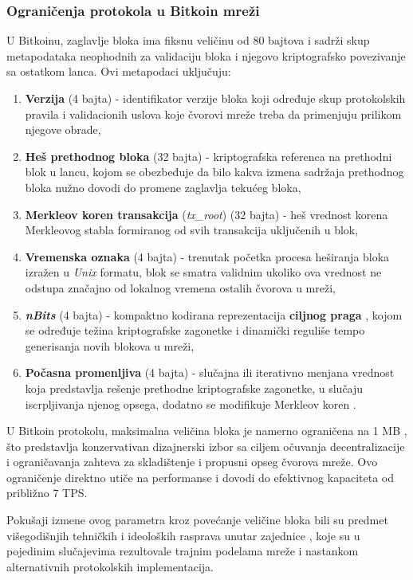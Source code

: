 \subsubsection{Ograničenja protokola u Bitkoin mreži}
U Bitkoinu, zaglavlje bloka ima fiksnu veličinu od 80 bajtova i sadrži skup metapodataka neophodnih za validaciju bloka i njegovo kriptografsko povezivanje sa ostatkom lanca. Ovi metapodaci uključuju:
\begin{enumerate}
\item \textbf{Verzija} (4 bajta) - identifikator verzije bloka koji određuje skup protokolskih pravila i validacionih uslova koje čvorovi mreže treba da primenjuju prilikom njegove obrade,
\item \textbf{Heš prethodnog bloka} (32 bajta) - kriptografska referenca na prethodni blok u lancu, kojom se obezbeđuje da bilo kakva izmena sadržaja prethodnog bloka nužno dovodi do promene zaglavlja tekućeg bloka,
\item \textbf{Merkleov koren transakcija} (\textit{tx\_root}) (32 bajta) - heš vrednost korena Merkleovog stabla formiranog od svih transakcija uključenih u blok,
\item \textbf{Vremenska oznaka} (4 bajta) - trenutak početka procesa heširanja bloka izražen u \textit{Unix} formatu, blok se smatra validnim ukoliko ova vrednost ne odstupa značajno od lokalnog vremena ostalih čvorova u mreži,
\item \textbf{\textit{nBits}} (4 bajta) - kompaktno kodirana reprezentacija \textbf{ciljnog praga} , kojom se određuje težina kriptografske zagonetke i dinamički reguliše tempo generisanja novih blokova u mreži,
\item \textbf{Počasna promenljiva}  (4 bajta) - slučajna ili iterativno menjana vrednost koja predstavlja rešenje prethodne kriptografske zagonetke, u slučaju iscrpljivanja njenog opsega, dodatno se modifikuje Merkleov koren .
\end{enumerate}

U Bitkoin protokolu, maksimalna veličina bloka je namerno ograničena na 1 MB \cite{croman2016scaling}, što predstavlja konzervativan dizajnerski izbor sa ciljem očuvanja decentralizacije i ograničavanja zahteva za skladištenje i propusni opseg čvorova mreže. Ovo ograničenje direktno utiče na performanse i dovodi do efektivnog kapaciteta od približno 7 TPS.

Pokušaji izmene ovog parametra kroz povećanje veličine bloka bili su predmet višegodišnjih tehničkih i ideoloških rasprava unutar zajednice , koje su u pojedinim slučajevima rezultovale trajnim podelama mreže i nastankom alternativnih protokolskih implementacija.

